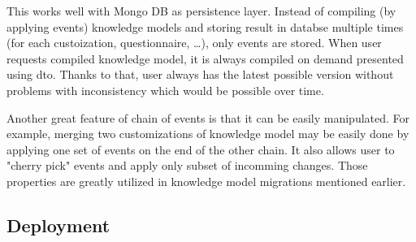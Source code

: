 This works well with Mongo DB as persistence layer.
Instead of compiling (by applying events) knowledge models and storing result in databse multiple times (for each custoization, questionnaire, \dots), only events are stored.
When user requests compiled knowledge model, it is always compiled on demand presented using dto.
Thanks to that, user always has the latest possible version without problems with inconsistency which would be possible over time.

Another great feature of chain of events is that it can be easily manipulated.
For example, merging two customizations of knowledge model may be easily done by applying one set of events on the end of the other chain.
It also allows user to "cherry pick" events and apply only subset of incomming changes.
Those properties are greatly utilized in knowledge model migrations mentioned earlier.

\subsection{Deployment}
